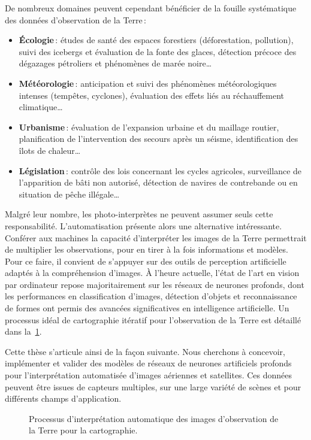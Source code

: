 De nombreux domaines peuvent cependant bénéficier de la fouille systématique des données d'observation de la Terre\,:
\begin{itemize}
	\item \textbf{Écologie}\,: études de santé des espaces forestiers (déforestation, pollution), suivi des icebergs et évaluation de la fonte des glaces, détection précoce des dégazages pétroliers et phénomènes de marée noire\dots
	\item \textbf{Météorologie}\,: anticipation et suivi des phénomènes météorologiques intenses (tempêtes, cyclones), évaluation des effets liés au réchauffement climatique\dots
	\item \textbf{Urbanisme}\,: évaluation de l'expansion urbaine et du maillage routier, planification de l'intervention des secours après un séisme, identification des îlots de chaleur\dots
	\item \textbf{Législation}\,: contrôle des lois concernant les cycles agricoles, surveillance de l'apparition de bâti non autorisé, détection de navires de contrebande ou en situation de pêche illégale\dots
\end{itemize}

Malgré leur nombre, les photo-interprètes ne peuvent assumer seuls cette responsabilité. L'automatisation présente alors une alternative intéressante. Conférer aux machines la capacité d'interpréter les images de la Terre permettrait de multiplier les observations, pour en tirer à la fois informations et modèles. Pour ce faire, il convient de s'appuyer sur des outils de perception artificielle adaptés à la compréhension d'images. À l'heure actuelle, l'état de l'art en vision par ordinateur repose majoritairement sur les réseaux de neurones profonds, dont les performances en classification d'images, détection d'objets et reconnaissance de formes ont permis des avancées significatives en intelligence artificielle. Un processus idéal de cartographie itératif pour l'observation de la Terre est détaillé dans la~\cref{fig:workflow}.

Cette thèse s'articule ainsi de la façon suivante. Nous cherchons à concevoir, implémenter et valider des modèles de réseaux de neurones artificiels profonds pour l'interprétation automatisée d'images aériennes et satellites. Ces données peuvent être issues de capteurs multiples, sur une large variété de scènes et pour différents champs d'application.

\begin{figure}[h]
    \centering
    \def\svgwidth{\columnwidth}
    
		\caption{Processus d'interprétation automatique des images d'observation de la Terre pour la cartographie.}
		\label{fig:workflow}
\end{figure}

